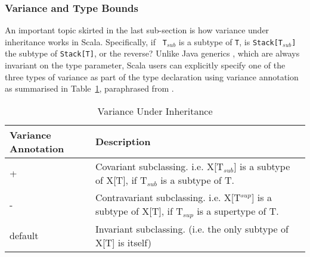 \begin{comment}
  \begin{lstlisting}[language=scala, escapechar=?]
object Client extends App {
  val stack:Stack[Integer] = new ListStack[Integer]  
  var i = 0
  for(i <- 0 until 4) stack.push(?\textcolor{blue}{ new Integer(i)}?)
  assert(stack.toString().equals("stack(3, 2, 1, 0)"))
  val top = stack.pop
  assert(top == 3 && stack.toString().equals("stack(2, 1, 0)"))
  val reverse = Stacks.reverse(stack)
  assert(stack.empty)
  assert(reverse.toString().equals("stack(0, 1, 2)"))
}
  \end{lstlisting}  
    
  \caption{Scala Example: A Generic Stack Library using Type Bounds}
  \label{scala_generic_bound_example}
\end{figure}

The remaining code in Figure~\ref{scala_generic_bound_example} is the same as 
the code in Figure~\ref{scala_generic_example} except that, on line 4 of the 
{\tt Client} example, the value of {\tt i} need to be explicitly converted to an 
{\tt Integer}.

\end{comment}
\subsubsection{Variance and Type Bounds}

An important topic skirted in the last sub-section
is how variance under inheritance works in Scala.   Specifically, if {\tt 
T$_{sub}$} is a subtype of {\tt T}, is {\tt Stack[T$_{sub}$]} the subtype of 
{\tt Stack[T]}, or the reverse?  Unlike Java generics \citep{JGC}, 
which are always invariant on the type parameter, Scala users can explicitly 
specify one of the three types of variance as part of the type declaration 
using variance annotation as summarised in Table~\ref{scala_variance}, 
paraphrased from \citep[Table 12.1]{scala_book}.

\begin{table}[h]
\begin{tabular}{| l | p{3.8 in} |}
\hline  
Variance Annotation & Description\\
\hline  
+  & Covariant subclassing. i.e. X[T$_{sub}$] is a subtype of X[T], if T$_{sub}$ is a subtype of T.\\
\hline  
-  & Contravariant subclassing. i.e. X[T$^{sup}$] is a subtype of X[T], if T$_{sup}$ is a supertype of T. \\
\hline  
default  & Invariant subclassing. (i.e. the only subtype of X[T] is itself)\\
\hline  
 
\end{tabular}
\caption{Variance Under Inheritance}
\label{scala_variance}
\end{table}




